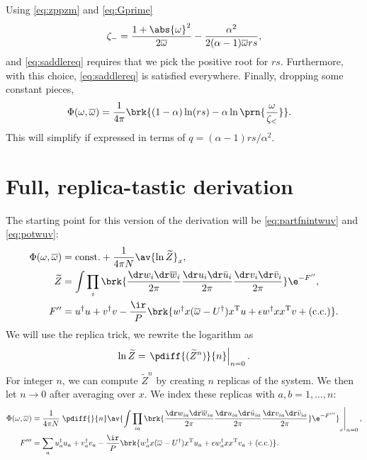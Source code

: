 \documentclass[12pt]{article}
\newcommand{\dg}{^\dagger}
\newcommand{\trans}{^\mathrm{T}}
\newcommand{\omb}{\overline{\omega}}
\newcommand{\dw}{\dr w}
\newcommand{\dwb}{\dr\overline{w}}
\newcommand{\du}{\dr u}
\newcommand{\dub}{\dr\bar{u}}
\newcommand{\dv}{\dr v}
\newcommand{\dvb}{\dr\bar{v}}
\begin{document}
%
Using \eqref{eq:zppzm} and \eqref{eq:Gprime}
%
\begin{equation}\label{eq:saddlesolzm}
\begin{aligned}
  \zeta_- &= \frac{1+\abs{\omega}^2}{2\omb} - \frac{\alpha^2}{2(\alpha-1)\omb rs},\\
\end{aligned}
\end{equation}
%
and \eqref{eq:saddlereq} requires that we pick the positive root for $rs$.
Furthermore, with this choice, \eqref{eq:saddlereq} is satisfied everywhere.
Finally, dropping some constant pieces,
%
\begin{equation}\label{eq:saddlesol}
\begin{aligned}
 \Phi(\omega,\omb) &= \frac{1}{4\pi}\brk{ (1-\alpha)\ln(rs) -\alpha\ln\prn{\frac{\omega}{\zeta_<}} }.
\end{aligned}
\end{equation}
%
This will simplify if expressed in terms of $q=(\alpha-1)rs/\alpha^2$.




\section{Full, replica-tastic derivation}\label{sec:replicader}


The starting point for this version of the derivation will be \eqref{eq:partfnintwuv} and \eqref{eq:potwuv}:
%
\begin{equation}\label{eq:phiint}
  \begin{aligned}
    \Phi(\omega,\omb) &= \text{const.} + \frac{1}{4\pi N} \av{\ln \widetilde{Z}}_x, \\
    \widetilde{Z} &= \int \prod_i\brk{ \frac{\dw_i\dwb_i}{2\pi} \frac{\du_i\dub_i}{2\pi} \frac{\dv_i\dvb_i}{2\pi} } \e^{-F''}, \\
    F'' &=  u\dg u + v\dg v -\frac{\ir}{P}\brk{ w\dg x(\omb-U\dg)x\trans u + \epsilon w\dg xx\trans v + (\text{c.c.}) }.
  \end{aligned}
\end{equation}
%
We will use the replica trick, \ie we rewrite the logarithm as
%
\begin{equation}\label{eq:replicatrick}
  \ln \widetilde{Z} = \left. \pdiff{( \widetilde{Z}^n )}{n}\right\rvert_{n=0}.
\end{equation}
%
For integer $n$, we can compute $\widetilde{Z}^n$ by creating $n$ replicas of the system.
We then let $n\to0$ after averaging over $x$.
We index these replicas with $a,b=1,\ldots,n$:
%
\begin{equation}\label{eq:phirep}
    \begin{aligned}
    \Phi(\omega,\omb) &= \frac{1}{4\pi N}  \left.\pdiff{}{n}\av{
       \int \prod_{ia}\brk{ \frac{\dw_{ia}\dwb_{ia}}{2\pi} \frac{\du_{ia}\dub_{ia}}{2\pi} \frac{\dv_{ia}\dvb_{ia}}{2\pi} } \e^{-F'''}
       }_x\right\rvert_{n=0}, \\
    F''' &= \sum_a  u_a\dg u_a + v_a\dg v_a -\frac{\ir}{P}\brk{ w_a\dg x(\omb-U\dg)x\trans u_a + \epsilon w_a\dg xx\trans v_a + (\text{c.c.}) }.
  \end{aligned}
\end{equation}
%
\end{document}
